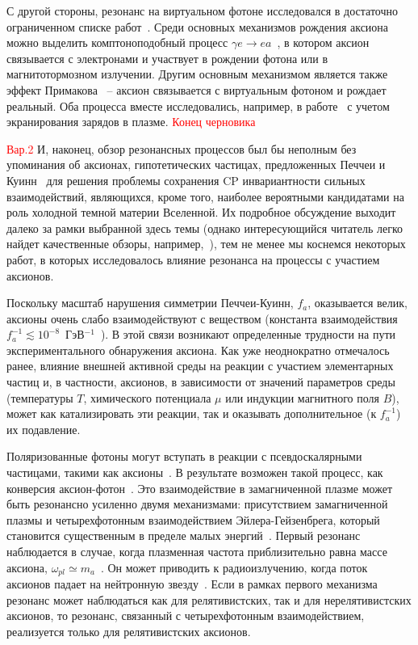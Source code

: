 С другой стороны, резонанс на виртуальном фотоне исследовался в достаточно ограниченном списке работ~\cite{Skobelev:2000,Skobelev:2007,MikhRumShk:09}. Среди основных механизмов рождения аксиона можно выделить комптоноподобный процесс $\gamma e \to e a$~\cite{Skobelev:2000}, в котором аксион связывается с электронами и участвует в рождении фотона или в магнитотормозном излучении. Другим основным механизмом является также эффект Примакова~\cite{Primakoff:1951} -- аксион связывается с виртуальным фотоном и рождает реальный. Оба процесса вместе исследовались, например, в работе~\cite{Raffelt:1996} с учетом экранирования зарядов в плазме.
\textcolor{red}{Конец черновика}

\textcolor{red}{Вар.2} И, наконец, обзор резонансных процессов был бы неполным без упоминания об аксионах, гипотетических частицах, предложенных Печчеи и Куинн~\cite{Quinn:1977} для решения проблемы сохранения CP инвариантности сильных взаимодействий, являющихся, кроме того, наиболее вероятными кандидатами на роль холодной темной материи Вселенной. Их подробное обсуждение выходит далеко за рамки выбранной здесь темы (однако интересующийся читатель легко найдет качественные обзоры, например,~\cite{Kim:2010, Marsh:2016}), тем не менее мы коснемся некоторых работ, в которых исследовалось влияние резонанса на процессы с участием аксионов.

Поскольку масштаб нарушения симметрии Печчеи-Куинн, $f_a$, оказывается велик, аксионы очень слабо взаимодействуют с веществом (константа взаимодействия $f_a^{-1} \lesssim 10^{-8}$\, ГэВ$^{-1}$~\cite{Raffelt:1996}). В этой связи возникают определенные трудности на пути экспериментального обнаружения аксиона. Как уже неоднократно отмечалось ранее, влияние внешней активной среды на реакции с участием элементарных частиц и, в частности,  аксионов, в зависимости от значений параметров среды (температуры  $T$, химического потенциала  $\mu$ или индукции магнитного поля  $B$), может как катализировать эти реакции, так и оказывать дополнительное (к $f_a^{-1}$) их подавление.

Поляризованные фотоны могут вступать в реакции с псевдоскалярными частицами, такими как аксионы~\cite{Sikivie:1983}. В результате возможен такой процесс, как конверсия аксион-фотон~\cite{Raffelt:1988}. Это взаимодействие в замагниченной плазме может быть резонансно усиленно двумя механизмами: присутствием замагниченной плазмы и четырехфотонным взаимодействием Эйлера-Гейзенбрега, который становится существенным в пределе малых энергий~\cite{Lai:2006}. Первый резонанс наблюдается в случае, когда плазменная частота приблизительно равна массе аксиона, $\omega_{pl}\simeq m_a$~\cite{Yanagida:1988}. Он может приводить к радиоизлучению, когда поток аксионов падает на нейтронную звезду~\cite{Pshirkov:2009}. Если в рамках первого механизма резонанс может наблюдаться как для релятивистских, так и для нерелятивистских аксионов, то резонанс, связанный с четырехфотонным взаимодействием, реализуется только для релятивистских аксионов.

